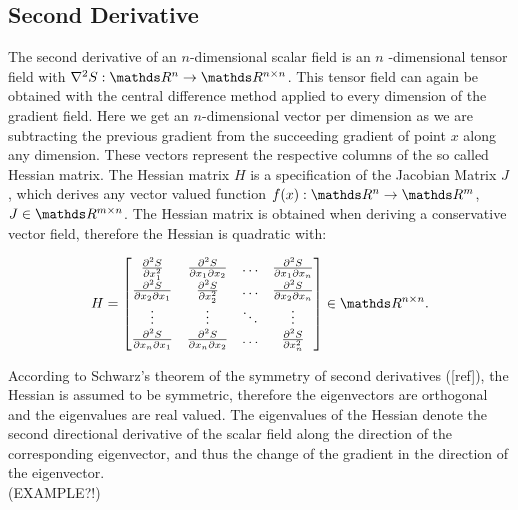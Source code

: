 \subsection{Second Derivative}

The second derivative of an $n$-dimensional scalar field is an $n$
-dimensional tensor field with $\nabla^2 S:\real^n \rightarrow \real^{n
\times n}$. This tensor field can again be obtained with the central
difference method applied to every dimension of the gradient field. Here
we get an $n$-dimensional vector per dimension as we are subtracting the
previous gradient from the succeeding gradient of point $x$ along any
dimension. These vectors represent the respective columns of the so
called Hessian matrix. The Hessian matrix $H$ is a specification of the
Jacobian Matrix $J$, which derives any vector valued function $f(x):
\real^n \rightarrow \real^m$, $J \in \real^{m \times n}$. The Hessian
matrix is obtained when deriving a conservative vector field, therefore
the Hessian is quadratic with:

\begin{equation}
  H =
  \begin{bmatrix}
    \frac{\partial^2 S}{\partial x_1^2} & \frac{\partial^2 S}{\partial x_1 \partial x_2} & \dots & \frac{\partial^2 S}{\partial x_1 \partial x_n}\\
    \frac{\partial^2 S}{\partial x_2 \partial x_1} & \frac{\partial^2 S}{\partial x_2^2} & \dots & \frac{\partial^2 S}{\partial x_2 \partial x_n}\\
    \vdots & \vdots & \ddots & \vdots \\
    \frac{\partial^2 S}{\partial x_n \partial x_1} & \frac{\partial^2 S}{\partial x_n \partial x_2} & \dots & \frac{\partial^2 S}{\partial x_n^2}
  \end{bmatrix}
  \in \real^{n \times n}.
\end{equation}

\noindent According to Schwarz's theorem of the symmetry of second
derivatives ([ref]), the Hessian is assumed to be symmetric, therefore
the eigenvectors are orthogonal and the eigenvalues are real valued. The
eigenvalues of the Hessian denote the second directional derivative of
the scalar field along the direction of the corresponding eigenvector,
and thus the change of the gradient in the direction of the eigenvector.
\\(EXAMPLE?!)

